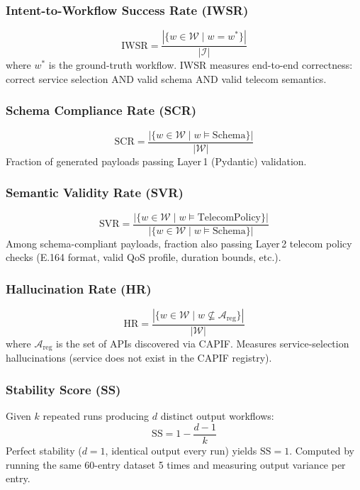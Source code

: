 \documentclass[conference]{IEEEtran}
\begin{document}
\subsubsection{Intent-to-Workflow Success Rate (IWSR)}
\begin{equation}
\text{IWSR} = \frac{|\{w \in \mathcal{W} \mid w = w^*\}|}{|\mathcal{I}|}
\end{equation}
where $w^*$ is the ground-truth workflow. IWSR measures end-to-end
correctness: correct service selection AND valid schema AND valid
telecom semantics.

\subsubsection{Schema Compliance Rate (SCR)}
\begin{equation}
\text{SCR} = \frac{|\{w \in \mathcal{W} \mid w \models \text{Schema}\}|}{|\mathcal{W}|}
\end{equation}
Fraction of generated payloads passing Layer\,1 (Pydantic) validation.

\subsubsection{Semantic Validity Rate (SVR)}
\begin{equation}
\text{SVR} = \frac{|\{w \in \mathcal{W} \mid w \models \text{TelecomPolicy}\}|}{|\{w \in \mathcal{W} \mid w \models \text{Schema}\}|}
\end{equation}
Among schema-compliant payloads, fraction also passing Layer\,2
telecom policy checks (E.164 format, valid QoS profile, duration
bounds, etc.).

\subsubsection{Hallucination Rate (HR)}
\begin{equation}
\text{HR} = \frac{|\{w \in \mathcal{W} \mid w \not\subseteq \mathcal{A}_{\text{reg}}\}|}{|\mathcal{W}|}
\end{equation}
where $\mathcal{A}_{\text{reg}}$ is the set of APIs discovered via
CAPIF. Measures service-selection hallucinations (service does not
exist in the CAPIF registry).

\subsubsection{Stability Score (SS)}
Given $k$ repeated runs producing $d$ distinct output workflows:
\begin{equation}
\text{SS} = 1 - \frac{d - 1}{k}
\end{equation}
Perfect stability ($d = 1$, identical output every run) yields
$\text{SS} = 1$. Computed by running the same 60-entry dataset
5 times and measuring output variance per entry.
\end{document}
